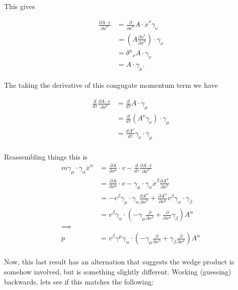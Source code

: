 \documentclass{article}
\newcommand{\pdot}[0]{\dot{p}}
\newcommand{\xdot}[0]{\dot{x}}
\newcommand{\PD}[2]{\frac{\partial {#2}}{\partial {#1}}}
\begin{document}
This gives

\begin{align*}
\PD{\xdot^\mu}{A \cdot v} 
&= \PD{\xdot^\mu}{} A \cdot \xdot^\nu \gamma_\nu \\
&= \left( A \PD{\xdot^\mu}{\xdot^\nu} \right) \cdot \gamma_\nu \\
&= {\delta^\mu}_\nu A \cdot \gamma_\nu \\
&= A \cdot \gamma_\mu.
\end{align*}

The taking the derivative of this congugate momentum term we have

\begin{align*}
\frac{d}{d\tau} \PD{\xdot^\mu}{A \cdot v} 
&= \frac{d}{d\tau} A \cdot \gamma_\mu \\
&= \frac{d}{d\tau} (A^\nu \gamma_\nu) \cdot \gamma_\mu \\
&= \frac{dA^\nu}{d\tau} \gamma_\nu \cdot \gamma_\mu \\
\end{align*}

Reassembling things this is
\begin{align*}
m \gamma_{\mu} \cdot \gamma_{\alpha} \ddot{x}^{\alpha} &= 
\frac{\partial A}{\partial x^{\mu}} \cdot v -\frac{d}{d\tau} \frac{\partial A \cdot v}{\partial \xdot^{\mu}} \\
&= \frac{\partial A}{\partial x^{\mu}} \cdot v - \gamma_{\mu} \cdot \gamma_{\alpha} \xdot^{\beta} \frac{\partial A^{\alpha}}{\partial x^{\beta}} \\
&= - v^{\beta} \gamma_{\mu} \cdot \gamma_{\alpha} \frac{\partial A^{\alpha}}{\partial x^{\beta}} + \frac{\partial A^{\alpha}}{\partial x^{\mu}} {v}^{\beta} \gamma_{\alpha} \cdot \gamma_{\beta} \\
&= v^{\beta} \gamma_{\alpha} \cdot \left( -\gamma_{\mu} \frac{\partial}{\partial x^{\beta}} + \frac{\partial}{\partial x^{\mu}} \gamma_{\beta} \right) A^{\alpha} \\
\implies \\
\pdot &= v^{\beta} \gamma^{\mu} \gamma_{\alpha} \cdot \left( -\gamma_{\mu} \frac{\partial}{\partial x^{\beta}} + \gamma_{\beta} \frac{\partial}{\partial x^{\mu}} \right) A^{\alpha} \\
\end{align*}

Now, this last result has an alternation that suggests the wedge product is somehow involved, but is something slightly different.  Working (guessing) backwards, lets
see if this matches the following:
\end{document}
